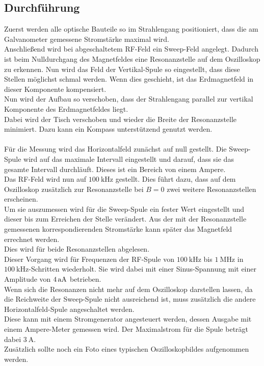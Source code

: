 \subsection{Durchführung}

Zuerst werden alle optische Bauteile so im Strahlengang positioniert, dass die am Galvanometer gemessene Stromstärke maximal wird.\\
Anschließend wird bei abgeschaltetem RF-Feld ein Sweep-Feld angelegt. Dadurch ist beim Nulldurchgang des Magnetfeldes eine Resonanzstelle auf dem Oszilloskop zu erkennen.
Nun wird das Feld der Vertikal-Spule so eingestellt, dass diese Stellen möglichst schmal werden. Wenn dies geschieht, ist das Erdmagnetfeld in dieser Komponente kompensiert.\\
Nun wird der Aufbau so verschoben, dass der Strahlengang parallel zur vertikal Komponente des Erdmagnetfeldes liegt. \\
Dabei wird der Tisch verschoben und wieder die Breite der Resonanzstelle minimiert. Dazu kann ein Kompass unterstützend genutzt werden.\\\\
Für die Messung wird das Horizontalfeld zunächst auf null gestellt.
Die Sweep-Spule wird auf das maximale Intervall eingestellt und darauf, dass sie das gesamte Intervall durchläuft. Dieses ist ein Bereich von einem Ampere.\\
Das RF-Feld wird nun auf $\SI{100}{\kilo\hertz}$ gestellt.
Dies führt dazu, dass auf dem Oszilloskop zusätzlich zur Resonanzstelle bei $B=0$ zwei weitere Resonanzstellen erscheinen.\\
Um sie auszumessen wird für die Sweep-Spule ein fester Wert eingestellt und dieser bis zum Erreichen der Stelle verändert.
Aus der mit der Resonanzstelle gemessenen korrespondierenden Stromstärke kann später das Magnetfeld errechnet werden.\\
Dies wird für beide Resonanzstellen abgelesen.\\
Dieser Vorgang wird für Frequenzen der RF-Spule von $\SI{100}{\kilo\hertz}$  bis $\SI{1}{\mega\hertz}$ in $ \SI{100}{\kilo\hertz}$-Schritten wiederholt.
Sie wird dabei mit einer Sinus-Spannung mit einer Amplitude von $\SI{4}{{a\ampere}}$ betrieben.\\
Wenn sich die Resonanzen nicht mehr auf dem Oszilloskop darstellen lassen, da die Reichweite der Sweep-Spule nicht ausreichend ist, muss zusätzlich die andere Horizontalfeld-Spule angeschaltet werden.\\
Diese kann mit einem Stromgenerator angesteuert werden, dessen Ausgabe mit einem Ampere-Meter gemessen wird. Der Maximalstrom für die Spule beträgt dabei $\SI{3}{\ampere}$.\\
Zusätzlich sollte noch ein Foto eines typischen Oszilloskopbildes aufgenommen werden.